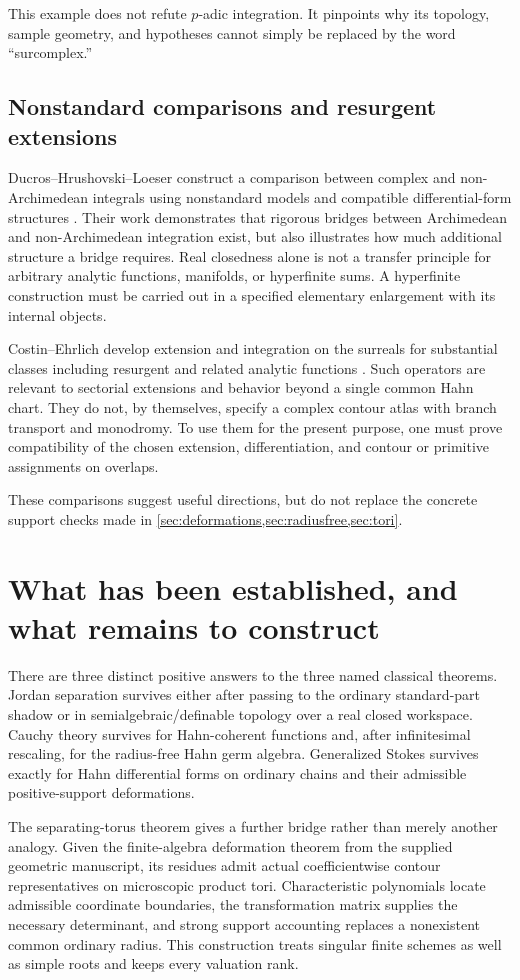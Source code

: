 \documentclass[11pt,letterpaper]{article}
\theoremstyle{definition}
\theoremstyle{remark}
\numberwithin{equation}{section}
\begin{document}
This example does not refute $p$-adic integration. It pinpoints why its topology, sample geometry, and hypotheses cannot simply be replaced by the word ``surcomplex.''

\subsection{Nonstandard comparisons and resurgent extensions}
Ducros--Hrushovski--Loeser construct a comparison between complex and non-Archimedean integrals using nonstandard models and compatible differential-form structures \cite{DHL}. Their work demonstrates that rigorous bridges between Archimedean and non-Archimedean integration exist, but also illustrates how much additional structure a bridge requires. Real closedness alone is not a transfer principle for arbitrary analytic functions, manifolds, or hyperfinite sums. A hyperfinite construction must be carried out in a specified elementary enlargement with its internal objects.

Costin--Ehrlich develop extension and integration on the surreals for substantial classes including resurgent and related analytic functions \cite{CE}. Such operators are relevant to sectorial extensions and behavior beyond a single common Hahn chart. They do not, by themselves, specify a complex contour atlas with branch transport and monodromy. To use them for the present purpose, one must prove compatibility of the chosen extension, differentiation, and contour or primitive assignments on overlaps.

These comparisons suggest useful directions, but do not replace the concrete support checks made in \cref{sec:deformations,sec:radiusfree,sec:tori}.

\section{What has been established, and what remains to construct}\label{sec:conclusion}
There are three distinct positive answers to the three named classical theorems. Jordan separation survives either after passing to the ordinary standard-part shadow or in semialgebraic/definable topology over a real closed workspace. Cauchy theory survives for Hahn-coherent functions and, after infinitesimal rescaling, for the radius-free Hahn germ algebra. Generalized Stokes survives exactly for Hahn differential forms on ordinary chains and their admissible positive-support deformations.

The separating-torus theorem gives a further bridge rather than merely another analogy. Given the finite-algebra deformation theorem from the supplied geometric manuscript, its residues admit actual coefficientwise contour representatives on microscopic product tori. Characteristic polynomials locate admissible coordinate boundaries, the transformation matrix supplies the necessary determinant, and strong support accounting replaces a nonexistent common ordinary radius. This construction treats singular finite schemes as well as simple roots and keeps every valuation rank.
\end{document}
